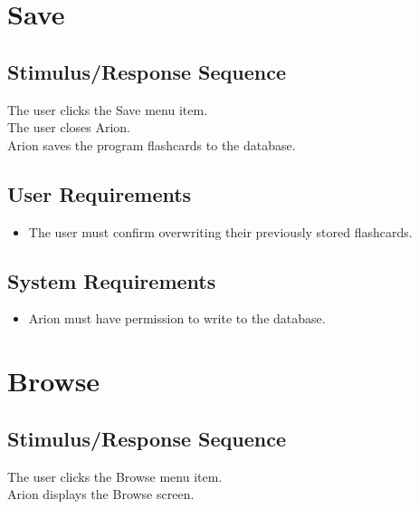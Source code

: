 \documentclass{scrreprt}
\begin{document}
\section{Save}
    \subsection*{Stimulus/Response Sequence}
        \begin{flushleft}
             The user clicks the Save menu item. \\
             The user closes Arion. \\
             Arion saves the program flashcards to the database.
        \end{flushleft}

    \subsection*{User Requirements}
        \begin{itemize}
            \item The user must confirm overwriting their previously stored flashcards.
        \end{itemize}

    \subsection*{System Requirements}
        \begin{itemize}
            \item Arion must have permission to write to the database.
        \end{itemize}

\section{Browse}
    \subsection*{Stimulus/Response Sequence}
        \begin{flushleft}
             The user clicks the Browse menu item. \\
             Arion displays the Browse screen. \\
        \end{flushleft}
\end{document}
